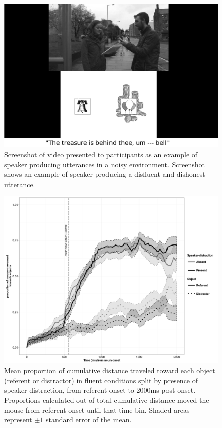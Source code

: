 \documentclass[man]{apa6}
\begin{document}
\begin{figure}
  \centering
	\includegraphics[scale=.2]{convincer.png}
  \caption{Screenshot of video presented to participants as an example of speaker producing utterances in a noisy environment. Screenshot shows an example of speaker producing a disfluent and dishonest utterance.}
  \label{fig:vid}
\end{figure}




\begin{figure}
  \centering
	\includegraphics[scale=.5]{mflu.png}
  \caption{Mean proportion of cumulative distance traveled toward each object (referent or distractor) in fluent conditions split by presence of speaker distraction, from referent onset to 2000ms post-onset. Proportions calculated out of total cumulative distance moved the mouse from referent-onset until that time bin. Shaded areas represent $\pm 1$ standard error of the mean.}
  \label{fig:mflu}
\end{figure}
\end{document}
